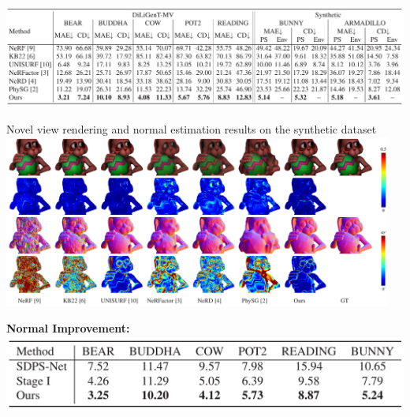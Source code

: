 \documentclass[landscape,a0paper,fontscale=0.292]{baposter}
\begin{document}
\begin{poster}
{\begin{minipage}[t]{0.49\textwidth}
\begin{center}
            \includegraphics[width=\textwidth]{images/table_nrf.pdf}
        \end{center}
        \vspace{-2em}
        \begin{center}
            Novel view rendering and normal estimation results on the synthetic dataset  \\
            \includegraphics[width=0.96\textwidth]{images/fig_nrf.pdf}
        \end{center}
        
        \vspace{-0.5em}
        \begin{minipage}[t]{0.53\textwidth}
        \textbf{\color{ctitle}Normal Improvement:} \\
            \includegraphics[width=\textwidth]{images/table_improve_normal.pdf}
        

\end{minipage}
\end{minipage}}
\end{poster}
\end{document}
